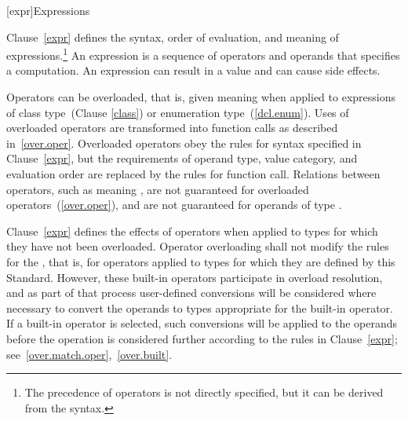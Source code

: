 [expr]{Expressions}


%
%
%
%
%
%
%

\pnum
{}%
\enternote 
Clause~\ref{expr} defines the syntax, order of evaluation, and meaning
of expressions.\footnote{The precedence of operators is not directly specified, but it can be
derived from the syntax.}
An expression is a sequence of operators and operands that specifies a
computation. An expression can result in a value and can cause side
effects.
\exitnote 

\pnum
{}%
\enternote 
Operators can be overloaded, that is, given meaning when applied to
expressions of class type~(Clause \ref{class}) or enumeration
type~(\ref{dcl.enum}). Uses of overloaded operators are transformed into
function calls as described in~\ref{over.oper}. Overloaded operators
obey the rules for syntax specified in Clause~\ref{expr}, but the
requirements of operand type, value category, and evaluation order are replaced
by the rules for function call. Relations between operators, such as
 meaning , are not guaranteed for overloaded
operators~(\ref{over.oper}), and are not guaranteed for operands of type
.
\exitnote 

\pnum
Clause~\ref{expr} defines the effects of operators when applied to types
for which they have not been overloaded. Operator overloading shall not
modify the rules for the , that
is, for operators applied to types for which they are defined by this
Standard. However, these built-in operators participate in overload
resolution, and as part of that process user-defined conversions will be
considered where necessary to convert the operands to types appropriate
for the built-in operator. If a built-in operator is selected, such
conversions will be applied to the operands before the operation is
considered further according to the rules in Clause~\ref{expr};
see~\ref{over.match.oper},~\ref{over.built}.

